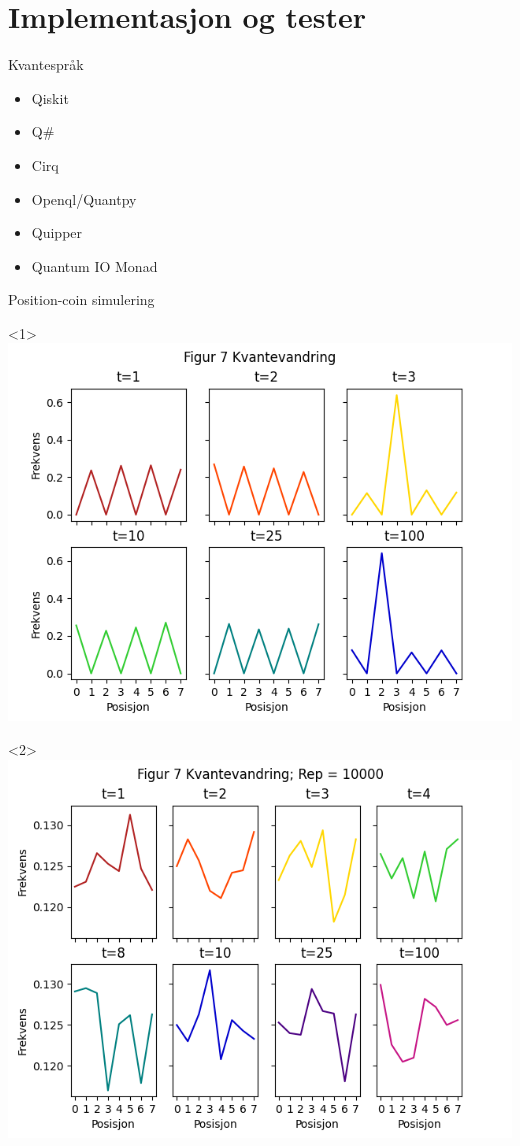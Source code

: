 \documentclass[norsk]{beamer}
\begin{document}
\section{Implementasjon og tester}

	\begin{frame}{Kvantespråk}
		\begin{itemize}
			\item Qiskit
			\item Q\#
			\item Cirq
			\item Openql/Quantpy
			\item Quipper
			\item Quantum IO Monad
		\end{itemize}
	\end{frame}

	\begin{frame}{Position-coin simulering}
			\begin{onlyenv}<1>
				\includegraphics[scale=0.5]{Fig7Start0.png}
			\end{onlyenv}
			\begin{onlyenv}<2>
				\includegraphics[scale=0.5]{Fig7Hadamard.png}

\end{onlyenv}
\end{frame}
\end{document}
